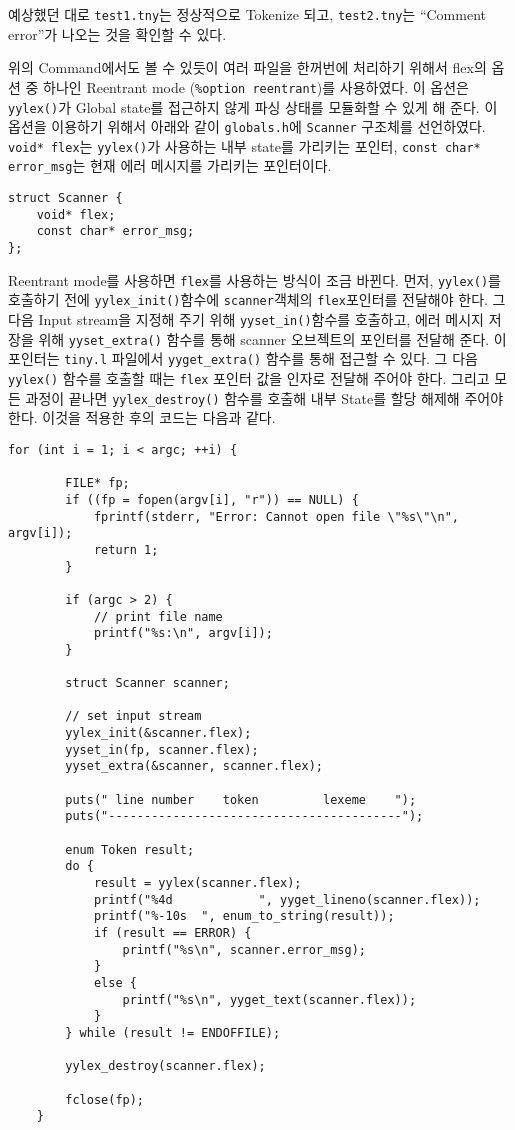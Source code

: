 \documentclass[a4paper, 10pt]{oblivoir}
\begin{document}
예상했던 대로 \texttt{test1.tny}는 정상적으로 Tokenize 되고, \texttt{test2.tny}는 ``Comment error''가 나오는 것을 확인할 수 있다.

위의 Command에서도 볼 수 있듯이 여러 파일을 한꺼번에 처리하기 위해서 flex의 옵션 중 하나인 Reentrant mode (\texttt{\%option reentrant})를 사용하였다. 이 옵션은 \texttt{yylex()}가 Global state를 접근하지 않게 파싱 상태를 모듈화할 수 있게 해 준다. 이 옵션을 이용하기 위해서 아래와 같이 \texttt{globals.h}에 \texttt{Scanner} 구조체를 선언하였다. \texttt{void* flex}는 \texttt{yylex()}가 사용하는 내부 state를 가리키는 포인터, \texttt{const char* error\_msg}는 현재 에러 메시지를 가리키는 포인터이다.

\begin{lstlisting}
struct Scanner {
    void* flex;
    const char* error_msg;
};
\end{lstlisting}

Reentrant mode를 사용하면 \texttt{flex}를 사용하는 방식이 조금 바뀐다. 먼저, \texttt{yylex()}를 호출하기 전에 \texttt{yylex\_init()}함수에 \texttt{scanner}객체의 \texttt{flex}포인터를 전달해야 한다. 그 다음 Input stream을 지정해 주기 위해 \texttt{yyset\_in()}함수를 호출하고, 에러 메시지 저장을 위해 \texttt{yyset\_extra()} 함수를 통해 scanner 오브젝트의 포인터를 전달해 준다. 이 포인터는 \texttt{tiny.l} 파일에서 \texttt{yyget\_extra()} 함수를 통해 접근할 수 있다. 그 다음 \texttt{yylex()} 함수를 호출할 때는 \texttt{flex} 포인터 값을 인자로 전달해 주어야 한다. 그리고 모든 과정이 끝나면 \texttt{yylex\_destroy()} 함수를 호출해 내부 State를 할당 해제해 주어야 한다. 이것을 적용한 후의 코드는 다음과 같다.

\begin{lstlisting}[caption=Segment of main.c, frame=single]
    for (int i = 1; i < argc; ++i) {

        FILE* fp;
        if ((fp = fopen(argv[i], "r")) == NULL) {
            fprintf(stderr, "Error: Cannot open file \"%s\"\n", argv[i]);
            return 1;
        }

        if (argc > 2) {
            // print file name
            printf("%s:\n", argv[i]);
        }

        struct Scanner scanner;

        // set input stream
        yylex_init(&scanner.flex);
        yyset_in(fp, scanner.flex);
        yyset_extra(&scanner, scanner.flex);

        puts(" line number    token         lexeme    ");
        puts("-----------------------------------------");

        enum Token result;
        do {
            result = yylex(scanner.flex);
            printf("%4d            ", yyget_lineno(scanner.flex));
            printf("%-10s  ", enum_to_string(result));
            if (result == ERROR) {
                printf("%s\n", scanner.error_msg);
            }
            else {
                printf("%s\n", yyget_text(scanner.flex));
            }
        } while (result != ENDOFFILE);

        yylex_destroy(scanner.flex);

        fclose(fp);
    }
\end{lstlisting}
\end{document}
